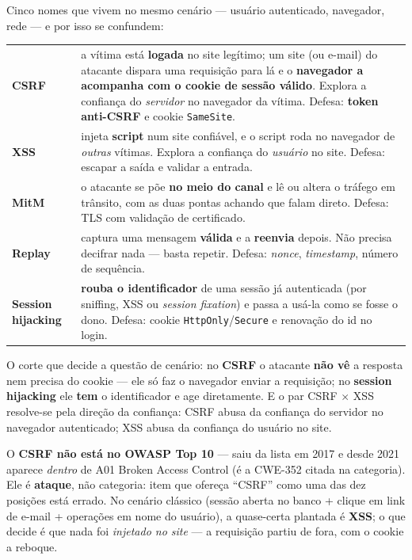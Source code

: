\begin{conceito}
Cinco nomes que vivem no mesmo cenário --- usuário autenticado, navegador,
rede --- e por isso se confundem:

\begin{center}
\begin{tabular}{@{}p{2.9cm}p{9.1cm}@{}}
\toprule
\textbf{CSRF} & a vítima está \textbf{logada} no site legítimo; um site (ou
e-mail) do atacante dispara uma requisição para lá e o \textbf{navegador a
acompanha com o cookie de sessão válido}. Explora a confiança do
\emph{servidor} no navegador da vítima. Defesa: \textbf{token anti-CSRF} e
cookie \texttt{SameSite}. \\
\addlinespace
\textbf{XSS} & injeta \textbf{script} num site confiável, e o script roda no
navegador de \emph{outras} vítimas. Explora a confiança do \emph{usuário} no
site. Defesa: escapar a saída e validar a entrada. \\
\addlinespace
\textbf{MitM} & o atacante se põe \textbf{no meio do canal} e lê ou altera o
tráfego em trânsito, com as duas pontas achando que falam direto. Defesa:
TLS com validação de certificado. \\
\addlinespace
\textbf{Replay} & captura uma mensagem \textbf{válida} e a \textbf{reenvia}
depois. Não precisa decifrar nada --- basta repetir. Defesa: \emph{nonce},
\emph{timestamp}, número de sequência. \\
\addlinespace
\textbf{Session hijacking} & \textbf{rouba o identificador} de uma sessão já
autenticada (por sniffing, XSS ou \emph{session fixation}) e passa a usá-la
como se fosse o dono. Defesa: cookie \texttt{HttpOnly}/\texttt{Secure} e
renovação do id no login. \\
\bottomrule
\end{tabular}
\end{center}

O corte que decide a questão de cenário: no \textbf{CSRF} o atacante
\textbf{não vê} a resposta nem precisa do cookie --- ele só faz o navegador
enviar a requisição; no \textbf{session hijacking} ele \textbf{tem} o
identificador e age diretamente. E o par CSRF $\times$ XSS resolve-se pela
direção da confiança: CSRF abusa da confiança do servidor no navegador
autenticado; XSS abusa da confiança do usuário no site.
\end{conceito}

\begin{pegadinha}
O \textbf{CSRF não está no OWASP Top 10} --- saiu da lista em 2017 e desde
2021 aparece \emph{dentro} de A01 Broken Access Control (é a CWE-352 citada
na categoria). Ele é \textbf{ataque}, não categoria: item que ofereça ``CSRF''
como uma das dez posições está errado. No cenário clássico (sessão aberta no
banco + clique em link de e-mail + operações em nome do usuário), a
quase-certa plantada é \textbf{XSS}; o que decide é que nada foi
\emph{injetado no site} --- a requisição partiu de fora, com o cookie a
reboque.
\end{pegadinha}

